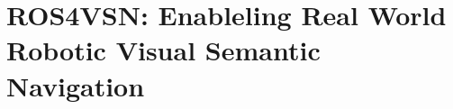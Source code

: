 \chapter{ROS4VSN: Enableling Real World Robotic Visual Semantic Navigation}\label{ch:ros4vsn:-enable-real-world-robotic-visual-semantic-navigation}